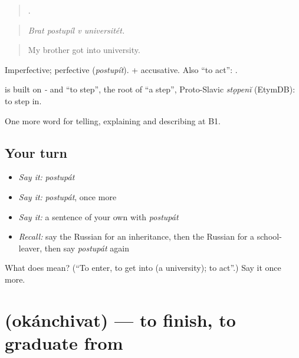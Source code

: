 \begin{quote}
   .
\end{quote}

\begin{quote}
\emph{Brat postupíl v universitét.}
\end{quote}

\begin{quote}
My brother got into university.
\end{quote}

Imperfective; perfective \emph{} (\emph{postupít}). \emph{ } + accusative. Also \textquotedblleft{}to act\textquotedblright{}: \emph{  }.

\begin{cousinweb}
\emph{} is built on \emph{-} and \emph{} \textquotedblleft{}to step\textquotedblright{}, the root of \emph{} \textquotedblleft{}a step\textquotedblright{}, Proto-Slavic \emph{stǫpenĭ} (EtymDB): to step in.
\end{cousinweb}

\begin{grammarlens}[title={What you've built}]
One more word for telling, explaining and describing at B1.
\end{grammarlens}

\subsection*{Your turn}
\begin{itemize}
\raggedright
  \item \emph{Say it:} \emph{postupát}
  \item \emph{Say it:} \emph{postupát}, once more
  \item \emph{Say it:} a sentence of your own with \emph{postupát}
  \item \emph{Recall:} say the Russian for an inheritance, then the Russian for a school-leaver, then say \emph{postupát} again
\end{itemize}

\begin{tcolorbox}[breakable,colback=teal!4,colframe=teal!35!black,title={Before you move on}]
What does  mean? (\textquotedblleft{}To enter, to get into (a university); to act\textquotedblright{}.) Say it once more.
\end{tcolorbox}
\section[\texorpdfstring{\ru{оканчивать} (okánchivat)}{оканчивать (okánchivat)}]{ (okánchivat) — to finish, to graduate from}


